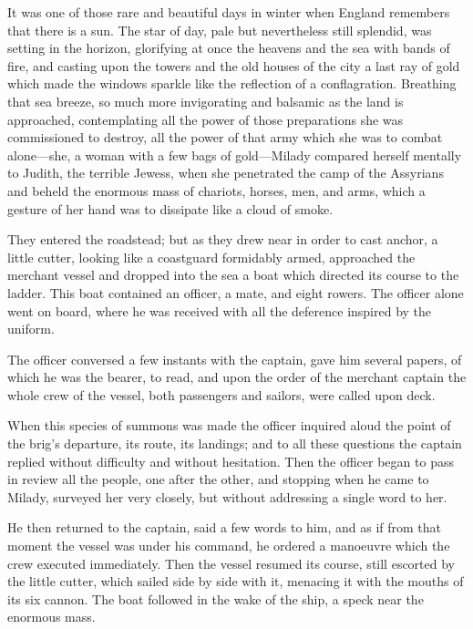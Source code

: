 It was one of those rare and beautiful days in winter when England remembers that there is a sun. The star of day, pale but nevertheless still splendid, was setting in the horizon, glorifying at once the heavens and the sea with bands of fire, and casting upon the towers and the old houses of the city a last ray of gold which made the windows sparkle like the reflection of a conflagration. Breathing that sea breeze, so much more invigorating and balsamic as the land is approached, contemplating all the power of those preparations she was commissioned to destroy, all the power of that army which she was to combat alone—she, a woman with a few bags of gold—Milady compared herself mentally to Judith, the terrible Jewess, when she penetrated the camp of the Assyrians and beheld the enormous mass of chariots, horses, men, and arms, which a gesture of her hand was to dissipate like a cloud of smoke. 

They entered the roadstead; but as they drew near in order to cast anchor, a little cutter, looking like a coastguard formidably armed, approached the merchant vessel and dropped into the sea a boat which directed its course to the ladder. This boat contained an officer, a mate, and eight rowers. The officer alone went on board, where he was received with all the deference inspired by the uniform. 

The officer conversed a few instants with the captain, gave him several papers, of which he was the bearer, to read, and upon the order of the merchant captain the whole crew of the vessel, both passengers and sailors, were called upon deck. 

When this species of summons was made the officer inquired aloud the point of the brig's departure, its route, its landings; and to all these questions the captain replied without difficulty and without hesitation. Then the officer began to pass in review all the people, one after the other, and stopping when he came to Milady, surveyed her very closely, but without addressing a single word to her. 

He then returned to the captain, said a few words to him, and as if from that moment the vessel was under his command, he ordered a manoeuvre which the crew executed immediately. Then the vessel resumed its course, still escorted by the little cutter, which sailed side by side with it, menacing it with the mouths of its six cannon. The boat followed in the wake of the ship, a speck near the enormous mass. 

